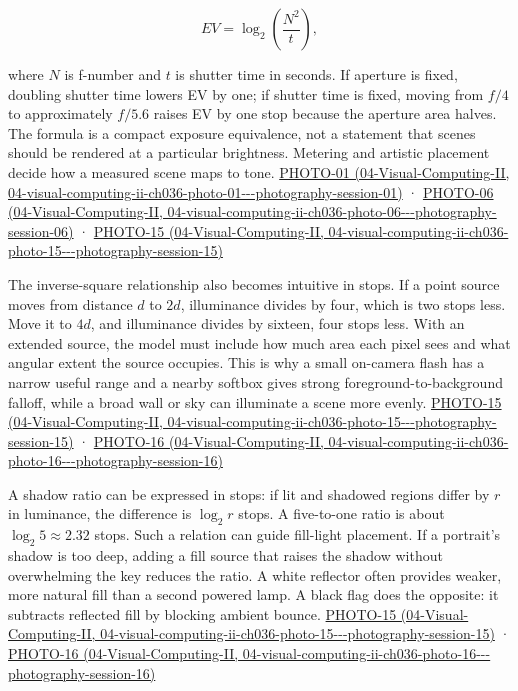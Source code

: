 \[
EV=\log_2\left(\frac{N^2}{t}\right),
\]

where \(N\) is f-number and \(t\) is shutter time in seconds. If aperture is fixed, doubling shutter time lowers EV by one; if shutter time is fixed, moving from \(f/4\) to approximately \(f/5.6\) raises EV by one stop because the aperture area halves. The formula is a compact exposure equivalence, not a statement that scenes should be rendered at a particular brightness. Metering and artistic placement decide how a measured scene maps to tone. \href{../04-Visual-Computing-II/main.pdf\#nameddest=04-visual-computing-ii-ch036-photo-01---photography-session-01}{PHOTO-01 (04-Visual-Computing-II, 04-visual-computing-ii-ch036-photo-01-\/-\/-photography-session-01)} · \href{../04-Visual-Computing-II/main.pdf\#nameddest=04-visual-computing-ii-ch036-photo-06---photography-session-06}{PHOTO-06 (04-Visual-Computing-II, 04-visual-computing-ii-ch036-photo-06-\/-\/-photography-session-06)} · \href{../04-Visual-Computing-II/main.pdf\#nameddest=04-visual-computing-ii-ch036-photo-15---photography-session-15}{PHOTO-15 (04-Visual-Computing-II, 04-visual-computing-ii-ch036-photo-15-\/-\/-photography-session-15)}

The inverse-square relationship also becomes intuitive in stops. If a point source moves from distance \(d\) to \(2d\), illuminance divides by four, which is two stops less. Move it to \(4d\), and illuminance divides by sixteen, four stops less. With an extended source, the model must include how much area each pixel sees and what angular extent the source occupies. This is why a small on-camera flash has a narrow useful range and a nearby softbox gives strong foreground-to-background falloff, while a broad wall or sky can illuminate a scene more evenly. \href{../04-Visual-Computing-II/main.pdf\#nameddest=04-visual-computing-ii-ch036-photo-15---photography-session-15}{PHOTO-15 (04-Visual-Computing-II, 04-visual-computing-ii-ch036-photo-15-\/-\/-photography-session-15)} · \href{../04-Visual-Computing-II/main.pdf\#nameddest=04-visual-computing-ii-ch036-photo-16---photography-session-16}{PHOTO-16 (04-Visual-Computing-II, 04-visual-computing-ii-ch036-photo-16-\/-\/-photography-session-16)}

A shadow ratio can be expressed in stops: if lit and shadowed regions differ by \(r\) in luminance, the difference is \(\log_2 r\) stops. A five-to-one ratio is about \(\log_2 5\approx2.32\) stops. Such a relation can guide fill-light placement. If a portrait's shadow is too deep, adding a fill source that raises the shadow without overwhelming the key reduces the ratio. A white reflector often provides weaker, more natural fill than a second powered lamp. A black flag does the opposite: it subtracts reflected fill by blocking ambient bounce. \href{../04-Visual-Computing-II/main.pdf\#nameddest=04-visual-computing-ii-ch036-photo-15---photography-session-15}{PHOTO-15 (04-Visual-Computing-II, 04-visual-computing-ii-ch036-photo-15-\/-\/-photography-session-15)} · \href{../04-Visual-Computing-II/main.pdf\#nameddest=04-visual-computing-ii-ch036-photo-16---photography-session-16}{PHOTO-16 (04-Visual-Computing-II, 04-visual-computing-ii-ch036-photo-16-\/-\/-photography-session-16)}

